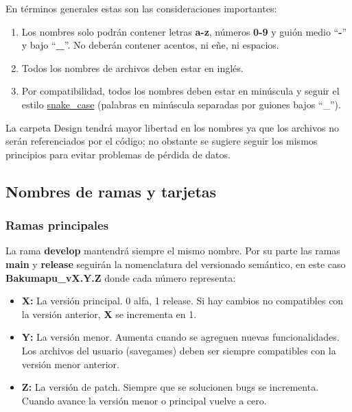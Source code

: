 En términos generales estas son las consideraciones importantes:

\begin{enumerate}
  \item Los nombres solo podrán contener letras \textbf{a-z}, números \textbf{0-9} y guión medio “\textbf{-}” y bajo “\textbf{\_}”. No deberán contener acentos, ni eñe, ni espacios.
  
  \item Todos los nombres de archivos deben estar en inglés.
  
  \item Por compatibilidad, todos los nombres deben estar en minúscula y seguir el estilo \href{https://en.wikipedia.org/wiki/Snake_case}{snake\_case} (palabras en minúscula separadas por guiones bajos “\_”).
\end{enumerate}

La carpeta Design tendrá mayor libertad en los nombres ya que los archivos no serán referenciados por el código; no obstante se sugiere seguir los mismos principios para evitar problemas de pérdida de datos.


\subsection{Nombres de ramas y tarjetas}\label{organizacion:nombres-de-ramas}

\subsubsection{Ramas principales}\label{organizacion:ramas-principales}

La rama \textbf{develop} mantendrá siempre el mismo nombre. Por su parte las ramas \textbf{main} y \textbf{release} seguirán la nomenclatura del versionado semántico, en este caso \textbf{Bakumapu\_vX.Y.Z} donde cada número representa:

\begin{itemize}[label=-]
	\item \textbf{X:} La versión principal. 0 alfa, 1 release. Si hay cambios no compatibles con la versión anterior, \textbf{X} se incrementa en 1.
	
	\item \textbf{Y:} La versión menor. Aumenta cuando se agreguen nuevas funcionalidades. Los archivos del usuario (savegames) deben ser siempre compatibles con la versión menor anterior.
	
	\item \textbf{Z:} La versión de patch. Siempre que se solucionen bugs se incrementa. Cuando avance la versión menor o principal vuelve a cero.
\end{itemize}


